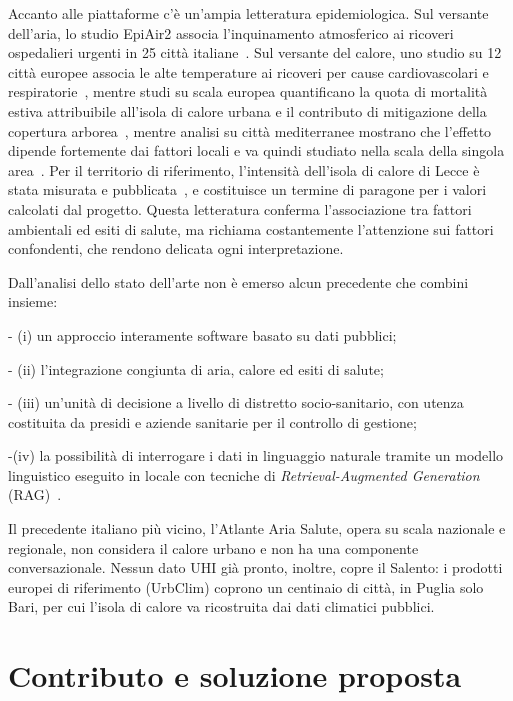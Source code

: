 Accanto alle piattaforme c'è un'ampia letteratura epidemiologica. Sul versante dell'aria, lo studio EpiAir2 associa l'inquinamento atmosferico ai ricoveri ospedalieri urgenti in 25 città italiane~\cite{scarinzi_epiair2_2013}. Sul versante del calore, uno studio su 12 città europee associa le alte temperature ai ricoveri per cause cardiovascolari e respiratorie~\cite{michelozzi_phewe_2009}, mentre studi su scala europea quantificano la quota di mortalità estiva attribuibile all'isola di calore urbana e il contributo di mitigazione della copertura arborea~\cite{iungman2023,huang2023}, mentre analisi su città mediterranee mostrano che l'effetto dipende fortemente dai fattori locali e va quindi studiato nella scala della singola area~\cite{cuerdo2023}. Per il territorio di riferimento, l'intensità dell'isola di calore di Lecce è stata misurata e pubblicata~\cite{pappaccogli_uhi_lecce_2024}, e costituisce un termine di paragone per i valori calcolati dal progetto. Questa letteratura conferma l'associazione tra fattori ambientali ed esiti di salute, ma richiama costantemente l'attenzione sui fattori confondenti, che rendono delicata ogni interpretazione.

Dall'analisi dello stato dell'arte non è emerso alcun precedente che combini insieme: 

- (i) un approccio interamente software basato su dati pubblici;

- (ii) l'integrazione congiunta di aria, calore ed esiti di salute; 

- (iii) un'unità di decisione a livello di distretto socio-sanitario, con utenza costituita da presidi e aziende sanitarie per il controllo di gestione; 

-(iv) la possibilità di interrogare i dati in linguaggio naturale tramite un modello linguistico eseguito in locale con tecniche di \emph{Retrieval-Augmented Generation} (RAG)~\cite{lewis_rag_2020}. 

Il precedente italiano più vicino, l'Atlante Aria Salute, opera su scala nazionale e regionale, non considera il calore urbano e non ha una componente conversazionale. Nessun dato UHI già pronto, inoltre, copre il Salento: i prodotti europei di riferimento (UrbClim) coprono un centinaio di città, in Puglia solo Bari, per cui l'isola di calore va ricostruita dai dati climatici pubblici.

\section{Contributo e soluzione proposta}
\label{sec:intro-contributo}

